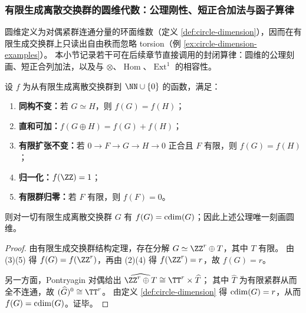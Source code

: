 \subsubsection{有限生成离散交换群的圆维代数：公理刚性、短正合加法与函子算律}\label{subsubsec:cdim-fg-abelian-calculus}
圆维定义为对偶紧群连通分量的环面维数（定义 \ref{def:circle-dimension}），因而在有限生成交换群上只读出自由秩而忽略 torsion（例 \ref{ex:circle-dimension-examples}）。
本小节记录若干可在后续章节直接调用的封闭算律：圆维的公理刻画、短正合列加法，以及与 \(\otimes\)、\(\operatorname{Hom}\)、\(\operatorname{Ext}^1\) 的相容性。

\begin{theorem}[圆维的公理刚性与不可替代性]\label{thm:cdim-axiomatic-rigidity}
设 \(f\) 为从有限生成离散交换群到 \(\NN\cup\{0\}\) 的函数，满足：
\begin{enumerate}
  \item \textbf{同构不变：}若 \(G\simeq H\)，则 \(f(G)=f(H)\)；
  \item \textbf{直和可加：}\(f(G\oplus H)=f(G)+f(H)\)；
  \item \textbf{有限扩张不变：}若 \(0\to F\to G\to H\to 0\) 正合且 \(F\) 有限，则 \(f(G)=f(H)\)；
  \item \textbf{归一化：}\(f(\ZZ)=1\)；
  \item \textbf{有限群归零：}若 \(F\) 有限，则 \(f(F)=0\)。
\end{enumerate}
则对一切有限生成离散交换群 \(G\) 有 \(f(G)=\operatorname{cdim}(G)\)；因此上述公理唯一刻画圆维。
\end{theorem}
\begin{proof}
由有限生成交换群结构定理，存在分解 \(G\simeq \ZZ^{r}\oplus T\)，其中 \(T\) 有限。
由 (3)(5) 得 \(f(G)=f(\ZZ^{r})\)，再由 (2)(4) 得 \(f(\ZZ^{r})=r\)，故 \(f(G)=r\)。
\par
另一方面，Pontryagin 对偶给出 \(\widehat{\ZZ^{r}\oplus T}\cong \TT^{r}\times \widehat T\)；
其中 \(\widehat T\) 为有限紧群从而全不连通，故 \((\widehat G)^0\cong \TT^{r}\)。
由定义 \ref{def:circle-dimension} 得 \(\operatorname{cdim}(G)=r\)，从而 \(f(G)=\operatorname{cdim}(G)\)。证毕。
\end{proof}

